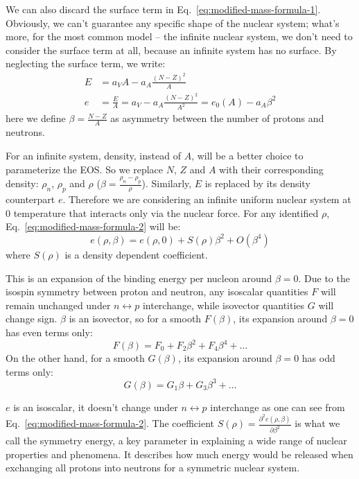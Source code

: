 We can also discard the surface term in Eq.~\ref{eq:modified-mass-formula-1}. 
Obviously, we can't guarantee
any specific shape of the nuclear system; what's more, for the most common model
-- the infinite nuclear system, we don't need to consider the surface 
term at all, because an infinite system has no surface. By neglecting the surface
term, we write:
\begin{equation}
    \begin{aligned}
	E &= a_V A - a_A\frac{(N-Z)^2}{A}  \\
	e &= \frac{E}{A} = a_V - a_A\frac{(N-Z)^2}{A^2} = e_0(A) - a_A\beta^2 
    \end{aligned}
    \label{eq:modified-mass-formula-2}
\end{equation}
here we define $\beta = \frac{N-Z}{A}$ as asymmetry between the number of protons and neutrons. 

For an infinite system, density, instead of $A$, will be a better choice to parameterize
the EOS. So we replace $N$, $Z$ and $A$ with their corresponding density: $\rho_n$, 
$\rho_p$ and $\rho$ ($\beta = \frac{\rho_n - \rho_p}{\rho}$). Similarly, $E$ is replaced by
its density counterpart $e$.
Therefore we are considering an infinite uniform nuclear system at 0 temperature that interacts
only via the nuclear force. For any identified $\rho$,
Eq.~\ref{eq:modified-mass-formula-2} will be:
\begin{equation}
    e(\rho, \beta) = e(\rho, 0) + S(\rho)\beta^2 + O(\beta^4)
    \label{eq:symmetry-energy}
\end{equation}
where $S(\rho)$ is a density dependent coefficient.

This is an expansion of the binding energy per nucleon around $\beta = 0$.
Due to the isospin symmetry between proton and neutron, any isoscalar quantities
$F$ will remain unchanged under $n \leftrightarrow p$ interchange, while isovector 
quantities $G$ will change sign. $\beta$ is an isovector, so for a smooth $F(\beta)$,
its expansion around $\beta = 0$ has even terms only:
$$ F(\beta) = F_0 + F_2\beta^2 + F_4\beta^4 + \dots $$
On the other hand, for a smooth $G(\beta)$, its expansion around $\beta = 0$ has
odd terms only:
$$ G(\beta) = G_1\beta + G_3\beta^3 + \dots $$

$e$ is an isoscalar, it doesn't change under $n \leftrightarrow p$ interchange 
as one can see from Eq.~\ref{eq:modified-mass-formula-2}. The coefficient 
$S(\rho) = \frac{\partial^2 e (\rho, \beta)}{\partial \beta^2}$ is
what we call the symmetry energy, a key parameter in explaining a wide
range of nuclear properties and phenomena. It describes how much energy would be
released when exchanging all protons into neutrons for a symmetric nuclear system. 

